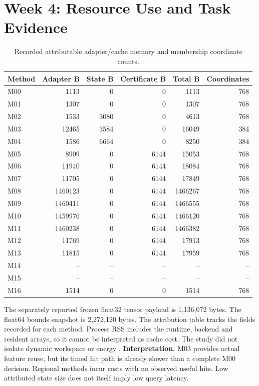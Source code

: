 \section{Week 4: Resource Use and Task Evidence}
\begin{table}[H]
\caption{Recorded attributable adapter/cache memory and membership coordinate counts.}
\centering\small
\begin{tabularx}{\textwidth}{@{}Yrrrrr@{}}\toprule
Method & Adapter B & State B & Certificate B & Total B & Coordinates\\
\midrule
M00 & 1113 & 0 & 0 & 1113 & 768\\
M01 & 1307 & 0 & 0 & 1307 & 768\\
M02 & 1533 & 3080 & 0 & 4613 & 768\\
M03 & 12465 & 3584 & 0 & 16049 & 384\\
M04 & 1586 & 6664 & 0 & 8250 & 384\\
M05 & 8909 & 0 & 6144 & 15053 & 768\\
M06 & 11940 & 0 & 6144 & 18084 & 768\\
M07 & 11705 & 0 & 6144 & 17849 & 768\\
M08 & 1460123 & 0 & 6144 & 1466267 & 768\\
M09 & 1460411 & 0 & 6144 & 1466555 & 768\\
M10 & 1459976 & 0 & 6144 & 1466120 & 768\\
M11 & 1460238 & 0 & 6144 & 1466382 & 768\\
M12 & 11769 & 0 & 6144 & 17913 & 768\\
M13 & 11815 & 0 & 6144 & 17959 & 768\\
M14 & -- & -- & -- & -- & --\\
M15 & -- & -- & -- & -- & --\\
M16 & 1514 & 0 & 0 & 1514 & 768\\
\bottomrule\end{tabularx}
\end{table}
The separately reported frozen float32 tensor payload is 1,136,072 bytes. The float64 bounds snapshot is 2,272,120 bytes. The attribution table tracks the fields recorded for each method. Process RSS includes the runtime, backend and resident arrays, so it cannot be interpreted as cache cost. The study did not isolate dynamic workspace or energy \cite{localw4}.
\textbf{Interpretation.} M03 provides actual feature reuse, but its timed hit path is already slower than a complete M00 decision. Regional methods incur costs with no observed useful hits. Low attributed state size does not itself imply low query latency.
